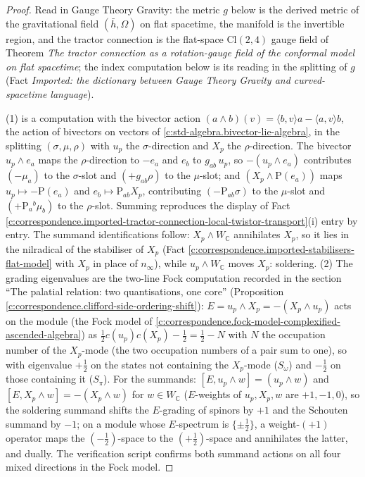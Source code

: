 \documentclass[11pt]{article}
\theoremstyle{definition}
\theoremstyle{plain}
\providecommand{\C}{}\renewcommand{\C}{\mathbb{C}}
\providecommand{\Cl}{}\renewcommand{\Cl}{\mathrm{Cl}}
\providecommand{\Som}{}\renewcommand{\Som}{S_\omega}
\providecommand{\Spi}{}\renewcommand{\Spi}{S_\pi}
\providecommand{\hb}{}\renewcommand{\hb}{\bar{h}}
\providecommand{\nInf}{}\renewcommand{\nInf}{n_\infty}
\providecommand{\ip}{}\renewcommand{\ip}[2]{\langle #1, #2\rangle}
\begin{document}
\begin{proof}
Read in Gauge Theory Gravity: the metric $g$ below is the derived metric of the gravitational field $(\hb, \Omega)$ on flat spacetime, the manifold is the invertible region, and the tractor connection is the flat-space $\Cl(2,4)$ gauge field of Theorem \emph{The tractor connection as a rotation-gauge field of the conformal model on flat spacetime}; the index computation below is its reading in the splitting of $g$ (Fact \emph{Imported: the dictionary between Gauge Theory Gravity and curved-spacetime language}).

(1) is a computation with the bivector action $(a\wedge b)(v) = \ip{b}{v}a - \ip{a}{v}b$, the action of bivectors on vectors of \ref{c:std-algebra.bivector-lie-algebra}, in the splitting $(\sigma, \mu, \rho)$ with $u_p$ the $\sigma$-direction and $X_p$ the $\rho$-direction. The bivector $u_p\wedge e_a$ maps the $\rho$-direction to $-e_a$ and $e_b$ to $g_{ab}\,u_p$, so $-(u_p\wedge e_a)$ contributes $(-\mu_a)$ to the $\sigma$-slot and $(+g_{ab}\rho)$ to the $\mu$-slot; and $(X_p\wedge \mathrm{P}(e_a))$ maps $u_p \mapsto -\mathrm{P}(e_a)$ and $e_b \mapsto \mathrm{P}_{ab}X_p$, contributing $(-\mathrm{P}_{ab}\sigma)$ to the $\mu$-slot and $(+\mathrm{P}_a{}^b\mu_b)$ to the $\rho$-slot. Summing reproduces the display of Fact \ref{c:correspondence.imported-tractor-connection-local-twistor-transport}(i) entry by entry. The summand identifications follow: $X_p\wedge W_\C$ annihilates $X_p$, so it lies in the nilradical of the stabiliser of $X_p$ (Fact \ref{c:correspondence.imported-stabilisers-flat-model} with $X_p$ in place of $\nInf$), while $u_p \wedge W_\C$ moves $X_p$: soldering.
(2) The grading eigenvalues are the two-line Fock computation recorded in the section ``The palatial relation: two quantisations, one core'' (Proposition \ref{c:correspondence.clifford-side-ordering-shift}): $E = u_p\wedge X_p = -(X_p\wedge u_p)$ acts on the module (the Fock model of \ref{c:correspondence.fock-model-complexified-ascended-algebra}) as $\tfrac12 c(u_p)c(X_p) - \tfrac12 = \tfrac12 - N$ with $N$ the occupation number of the $X_p$-mode (the two occupation numbers of a pair sum to one), so with eigenvalue $+\tfrac12$ on the states not containing the $X_p$-mode ($\Som$) and $-\tfrac12$ on those containing it ($\Spi$). For the summands: $[E, u_p\wedge w] = (u_p\wedge w)$ and $[E, X_p\wedge w] = -(X_p\wedge w)$ for $w \in W_\C$ ($E$-weights of $u_p, X_p, w$ are $+1, -1, 0$), so the soldering summand shifts the $E$-grading of spinors by $+1$ and the Schouten summand by $-1$; on a module whose $E$-spectrum is $\{\pm\tfrac12\}$, a weight-$(+1)$ operator maps the $(-\tfrac12)$-space to the $(+\tfrac12)$-space and annihilates the latter, and dually. The verification script confirms both summand actions on all four mixed directions in the Fock model.

\end{proof}
\end{document}
